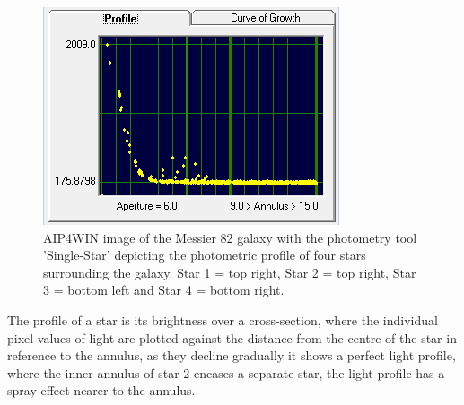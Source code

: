 \documentclass[12pt]{article}
\begin{document}
\begin{figure}[H]
\begin{multicols}{2}
\begin{minipage}[H]{0.5\textwidth}
\end{minipage}
\begin{minipage}[H]{0.5\textwidth}
\includegraphics[scale=1.0]{Images/AsImages/SS/Sr4-Profile.PNG}
\end{minipage}
\end{multicols}
\caption{AIP4WIN image of the Messier 82 galaxy with the photometry tool 'Single-Star' depicting the photometric profile of four stars surrounding the galaxy. Star 1 = top right, Star 2 = top right, Star 3 = bottom left and Star 4 = bottom right.}
\label{SS-Profile}
\end{figure}

The profile of a star is its brightness over a cross-section, where the individual pixel values of light are plotted against the distance from the centre of the star in reference to the annulus, as they decline gradually it shows a perfect light profile, where the inner annulus of star 2 encases a separate star, the light profile has a spray effect nearer to the annulus. \\
\end{document}
